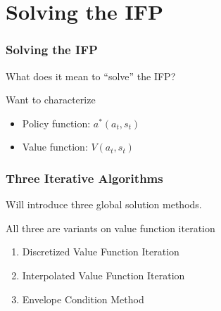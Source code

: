 \documentclass[10pt]{beamer}
\begin{document}
\section{Solving the IFP}

\begin{frame} \frametitle{Solving the IFP}
  What does it mean to ``solve'' the IFP?

  \vspace{0.5cm}

  Want to characterize
  \begin{itemize}
    \item Policy function: $a^*(a_t, s_t)$
    \item Value function: $V(a_t, s_t)$
  \end{itemize}

\end{frame}

\begin{frame} \frametitle{Three Iterative Algorithms}

  Will introduce three global solution methods.

  All three are variants on value function iteration

  \begin{enumerate}
    \item Discretized Value Function Iteration
    \item Interpolated Value Function Iteration
    \item Envelope Condition Method
  \end{enumerate}

\end{frame}
\end{document}
